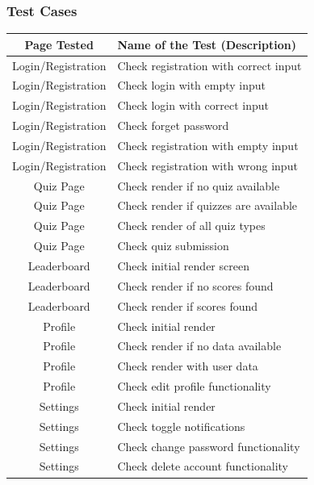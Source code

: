\subsubsection{Test Cases}

\begin{tabular}{|c|l|}
    \hline
    \textbf{Page Tested} & \textbf{Name of the Test (Description)} \\
    \hline
    Login/Registration & Check registration with correct input \\
    \hline
    Login/Registration & Check login with empty input \\
    \hline
    Login/Registration & Check login with correct input \\
    \hline
    Login/Registration & Check forget password \\
    \hline
    Login/Registration & Check registration with empty input \\
    \hline
    Login/Registration & Check registration with wrong input \\
    \hline
    Quiz Page & Check render if no quiz available \\
    \hline
    Quiz Page & Check render if quizzes are available \\
    \hline
    Quiz Page & Check render of all quiz types \\
    \hline
    Quiz Page & Check quiz submission \\
    \hline
    Leaderboard & Check initial render screen \\
    \hline
    Leaderboard & Check render if no scores found \\
    \hline
    Leaderboard & Check render if scores found \\
    \hline
    Profile & Check initial render \\
    \hline
    Profile & Check render if no data available \\
    \hline
    Profile & Check render with user data \\
    \hline
    Profile & Check edit profile functionality \\
    \hline
    Settings & Check initial render \\
    \hline
    Settings & Check toggle notifications \\
    \hline
    Settings & Check change password functionality \\
    \hline
    Settings & Check delete account functionality \\
    \hline
\end{tabular}

